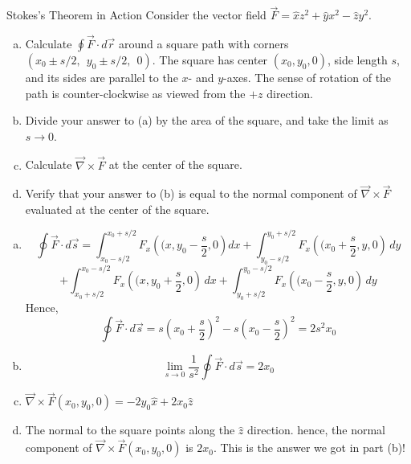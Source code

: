 \documentclass{esg8022pset}
\begin{document}
\begin{problem}{Stokes's Theorem in Action}
  Consider the vector field $\vec{F} = \hat{x} z^2 + \hat{y} x^2 - \hat{z} y^2$.
  \begin{enumerate}[(a)]
    \item Calculate $\oint \vec{F} \cdot d\vec{r}$ around a square path with
      corners $(x_0 \pm s/2,~~y_0 \pm s/2,~~0)$. The square has
      center $(x_0,y_0,0)$, side length $s$, and its sides are parallel to
      the $x$- and $y$-axes. The sense of rotation of the path
      is counter-clockwise as viewed from the $+z$ direction.
    \item Divide your answer to (a) by the area of the square, and take
      the limit as $s\rightarrow 0$.
    \item Calculate $\vec{\nabla}\times \vec{F}$ at the center of the square.
    \item Verify that your answer to (b) is equal to the normal component
      of $\vec{\nabla}\times\vec{F}$ evaluated at the center of the square.
  \end{enumerate}
\end{problem}
\begin{solution}
  \begin{enumerate}[(a)]
    \item $$\oint \vec{F} \cdot d\vec{s} = \int_{x_0-s/2}^{x_0+s/2} F_x\left((x,y_0 -\frac{s}{2},0 \right) dx + \int_{y_0-s/2}^{y_0+s/2} F_x\left((x_0 +\frac{s}{2},y,0 \right)\,dy  $$ $$+ \int_{x_0+s/2}^{x_0-s/2} F_x\left((x,y_0 +\frac{s}{2},0 \right)\,dx +  \int_{y_0+s/2}^{y_0-s/2} F_x\left((x_0 -\frac{s}{2},y,0 \right)\,dy$$
      Hence,
      $$\oint \vec{F} \cdot d\vec{s} = s\left( x_0 + \frac{s}{2} \right)^2-s\left( x_0 - \frac{s}{2} \right)^2 = 2 s^2 x_0$$
    \item $$\lim_{s\rightarrow 0}\frac{1}{s^2}\oint \vec{F} \cdot d\vec{s} = 2 x_0$$
    \item $\vec{\nabla} \times \vec{F} (x_0,y_0,0)= -2 y_0 \hat x + 2 x_0 \hat z $
    \item The normal to the square points along the $\hat z$ direction. hence, the normal component of $\vec{\nabla} \times \vec{F} (x_0,y_0,0)$ is $2x_0$. This is the answer we got in part (b)!
  \end{enumerate}
\end{solution}
\end{document}
